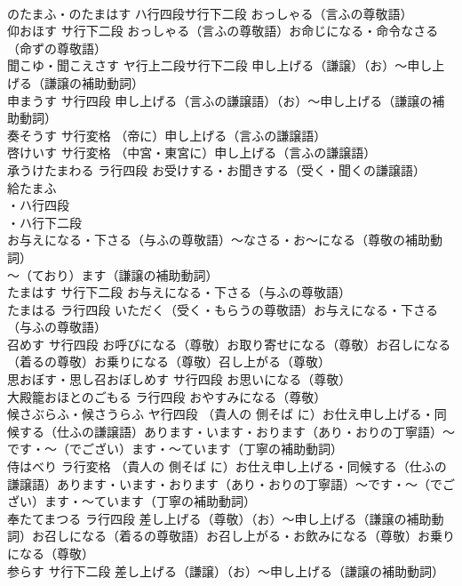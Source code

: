 \documentclass[8pt]{extreport}
\begin{document}
\begin{CJK}{UTF8}{min}
\\	のたまふ・のたまはす		ハ行四段サ行下二段	おっしゃる（言ふの尊敬語）
\\	仰おほす		サ行下二段	おっしゃる（言ふの尊敬語）お命じになる・命令なさる（命ずの尊敬語）
\\	聞こゆ・聞こえさす		ヤ行上二段サ行下二段	申し上げる（謙譲）（お）～申し上げる（謙譲の補助動詞）
\\	申まうす		サ行四段	申し上げる（言ふの謙譲語）（お）～申し上げる（謙譲の補助動詞）
\\	奏そうす		サ行変格	（帝に）申し上げる（言ふの謙譲語）
\\	啓けいす		サ行変格	（中宮・東宮に）申し上げる（言ふの謙譲語）
\\	承うけたまわる		ラ行四段	お受けする・お聞きする（受く・聞くの謙譲語）
\\	給たまふ		
\\	・ハ行四段
\\	・ハ行下二段	
\\	お与えになる・下さる（与ふの尊敬語）～なさる・お～になる（尊敬の補助動詞）
\\	～（ており）ます（謙譲の補助動詞）
\\	たまはす		サ行下二段	お与えになる・下さる（与ふの尊敬語）
\\	たまはる		ラ行四段	いただく（受く・もらうの尊敬語）お与えになる・下さる（与ふの尊敬語）
\\	召めす		サ行四段	お呼びになる（尊敬）お取り寄せになる（尊敬）お召しになる（着るの尊敬）お乗りになる（尊敬）召し上がる（尊敬）
\\	思おぼす・思し召おぼしめす		サ行四段	お思いになる（尊敬）
\\	大殿籠おほとのごもる		ラ行四段	おやすみになる（尊敬）
\\	候さぶらふ・候さうらふ		ヤ行四段	（貴人の 側そば に）お仕え申し上げる・同候する（仕ふの謙譲語）あります・います・おります（あり・おりの丁寧語）～です・～（でござい）ます・～ています（丁寧の補助動詞）
\\	侍はべり		ラ行変格	（貴人の 側そば に）お仕え申し上げる・同候する（仕ふの謙譲語）あります・います・おります（あり・おりの丁寧語）～です・～（でござい）ます・～ています（丁寧の補助動詞）
\\	奉たてまつる		ラ行四段	差し上げる（尊敬）（お）～申し上げる（謙譲の補助動詞）お召しになる（着るの尊敬語）お召し上がる・お飲みになる（尊敬）お乗りになる（尊敬）
\\	参らす		サ行下二段	差し上げる（謙譲）（お）～申し上げる（謙譲の補助動詞）

\end{CJK}
\end{document}

